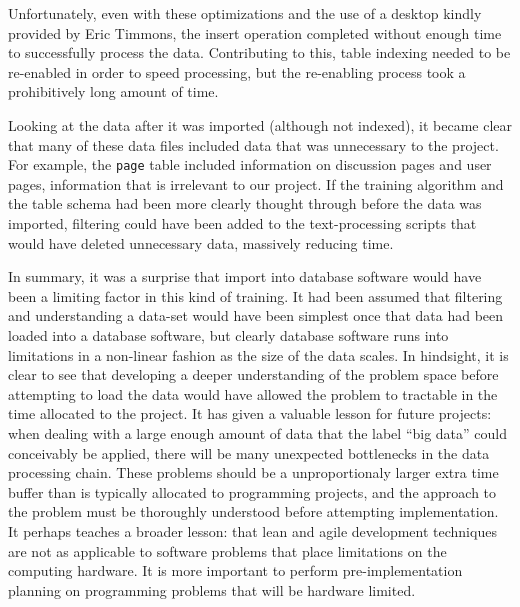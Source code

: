 Unfortunately, even with these optimizations and the use of a desktop kindly
provided by Eric Timmons, the insert operation completed without enough time to
successfully process the data.  Contributing to this, table indexing
needed to be re-enabled in order to speed processing, but the re-enabling
process took a prohibitively long amount of time.

Looking at the data after it was imported (although not indexed), it became
clear that many of these data files included data that was unnecessary to the
project.  For example, the \texttt{page} table included information on
discussion pages and user pages, information that is irrelevant to our project.
If the training algorithm and the table schema had been more clearly thought
through before the data was imported, filtering could have been added to the
text-processing scripts that would have deleted unnecessary data, massively
reducing time. 

In summary, it was a surprise that import into database software would have been
a limiting factor in this kind of training. It had been assumed that filtering
and understanding a data-set would have been simplest once that data had been
loaded into a database software, but clearly database software runs into
limitations in a non-linear fashion as the size of the data scales. In
hindsight, it is clear to see that developing a deeper understanding of the
problem space before attempting to load the data would have allowed the problem
to tractable in the time allocated to the project. It has given a valuable
lesson for future projects: when dealing with a large enough amount of data that
the label ``big data'' could conceivably be applied, there will be many
unexpected bottlenecks in the data processing chain. These problems should be a
unproportionaly larger extra time buffer than is typically allocated to
programming projects, and the approach to the problem must be thoroughly
understood before attempting implementation. It perhaps teaches a broader
lesson: that lean and agile development techniques are not as applicable to
software problems that place limitations on the computing hardware. It is more
important to perform pre-implementation planning on programming problems that
will be hardware limited.
